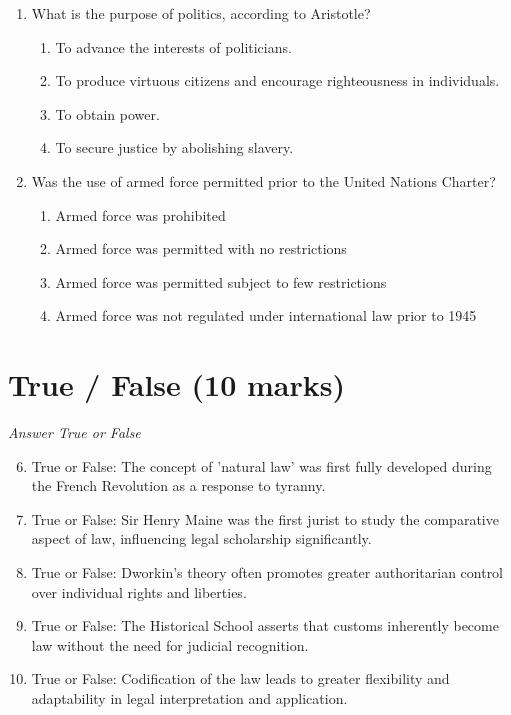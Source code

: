 \documentclass[12pt]{article}
\begin{document}
\begin{enumerate}[label=\arabic*.]
\item What is the purpose of politics, according to Aristotle?
\begin{enumerate}[label=(\alph*)]
    \item To advance the interests of politicians.
    \item To produce virtuous citizens and encourage righteousness in individuals.
    \item To obtain power.
    \item To secure justice by abolishing slavery.
\end{enumerate}
\item Was the use of armed force permitted prior to the United Nations Charter?
\begin{enumerate}[label=(\alph*)]
    \item Armed force was prohibited
    \item Armed force was permitted with no restrictions
    \item Armed force was permitted subject to few restrictions
    \item Armed force was not regulated under international law prior to 1945
\end{enumerate}
\end{enumerate}

\section*{True / False (10 marks)}
\textit{Answer True or False}
\begin{enumerate}[label=\arabic*.]
\setcounter{enumi}{5}
\item True or False: The concept of 'natural law' was first fully developed during the French Revolution as a response to tyranny.
\item True or False: Sir Henry Maine was the first jurist to study the comparative aspect of law, influencing legal scholarship significantly.
\item True or False: Dworkin's theory often promotes greater authoritarian control over individual rights and liberties.
\item True or False: The Historical School asserts that customs inherently become law without the need for judicial recognition.
\item True or False: Codification of the law leads to greater flexibility and adaptability in legal interpretation and application.
\end{enumerate}
\end{document}
